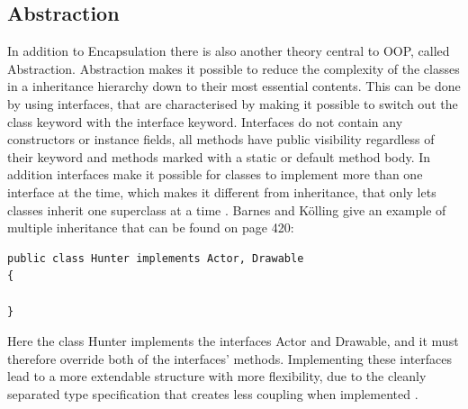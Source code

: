 \documentclass[British]{article}
\begin{document}
\subsection{Abstraction}
In addition to Encapsulation there is also another theory central to OOP, called Abstraction. Abstraction makes it possible to reduce the complexity of the classes in a inheritance hierarchy down to their most essential contents. This can be done by using interfaces, that are characterised by making it possible to switch out the class keyword with the interface keyword. Interfaces do not contain any constructors or instance fields, all methods have public visibility regardless of their keyword and methods marked with a static or default method body. In addition interfaces make it possible for classes to implement more than one interface at the time, which makes it different from inheritance, that only lets classes inherit one superclass at a time \cite[pp.~417-418]{barnes2017objects}. Barnes and Kölling give an example of multiple inheritance that can be found on page 420: 
\begin{lstlisting}
public class Hunter implements Actor, Drawable
{

}
\end{lstlisting}
Here the class Hunter implements the interfaces Actor and Drawable, and it must therefore override both of the interfaces' methods. Implementing these interfaces lead to a more extendable structure with more flexibility, due to the cleanly separated type specification that creates less coupling when implemented \cite[p.~428]{barnes2017objects}. 


\end{document}
